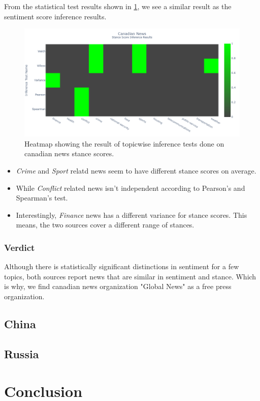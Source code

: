 \documentclass{article}
\theoremstyle{mytheoremstyle}
\theoremstyle{mytheoremstyle}
\theoremstyle{myproblemstyle}
\begin{document}
    From the statistical test results shown in \ref{fig:canada_stance_score_heatmap}, we see a similar result as the sentiment score inference results. 

    \begin{figure}[hp]
        \centering
        \includegraphics[width=\linewidth]{../images/plots/Canada/canada_heatmap_inference_stance.png}
        \caption{Heatmap showing the result of topicwise inference tests done on canadian news stance scores.}
        \label{fig:canada_stance_score_heatmap}
    \end{figure}
    
    \begin{itemize}
        \item \emph{Crime} and \emph{Sport} relatd news seem to have different stance scores on average.
        \item While \emph{Conflict} related news isn't independent according to Pearson's and Spearman's test.
        \item Interestingly, \emph{Finance} news has a different variance for stance scores. This means, the two sources cover a different range of stances.
    \end{itemize}

    \subsubsection{Verdict}

    Although there is statistically significant distinctions in sentiment for a few topics, both sources report news that are similar in sentiment and stance. Which is why, we find canadian news organization "Global News" as a free press organization.
    
    \subsection{China}

    \subsection{Russia}

    \section{Conclusion}

    
    

    
\end{document}
